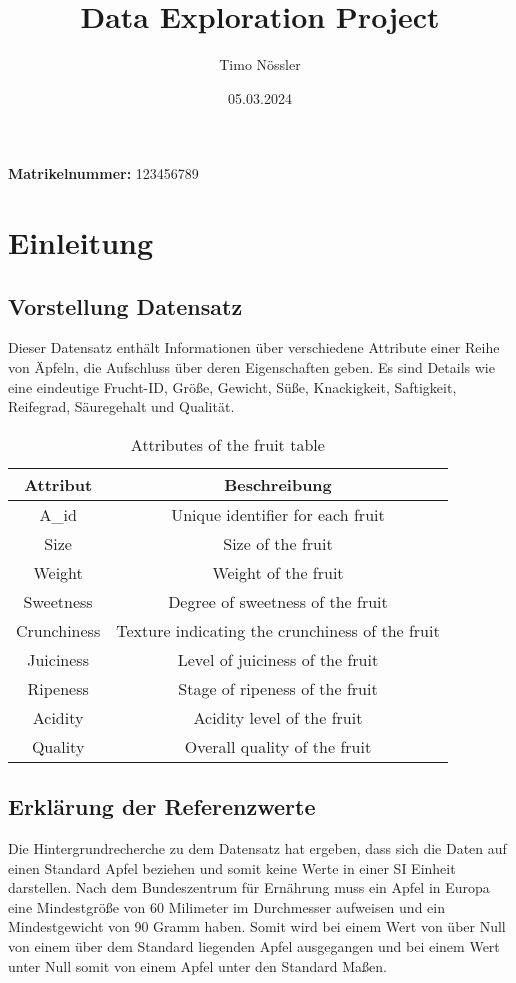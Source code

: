 \documentclass{article}
\title{\Huge Data Exploration Project}
\author{Timo Nössler}
\date{\vspace{2cm}05.03.2024}
\begin{document}
\clearpage\maketitle
\thispagestyle{empty}
\begin{center}
\textbf{Matrikelnummer:} 123456789
\end{center}
\newpage
\tableofcontents
\newpage


\section{Einleitung}
\subsection{Vorstellung Datensatz}
Dieser Datensatz enthält Informationen über verschiedene Attribute einer Reihe von Äpfeln, die Aufschluss über deren Eigenschaften geben. Es sind Details wie eine eindeutige Frucht-ID, Größe, Gewicht, Süße, Knackigkeit, Saftigkeit, Reifegrad, Säuregehalt und Qualität. 
\begin{table}[h]
\centering
\begin{tabular}{|c|c|}
\hline
\textbf{Attribut} & \textbf{Beschreibung} \\
\hline
A\_id & Unique identifier for each fruit \\
Size & Size of the fruit \\
Weight & Weight of the fruit \\
Sweetness & Degree of sweetness of the fruit \\
Crunchiness & Texture indicating the crunchiness of the fruit \\
Juiciness & Level of juiciness of the fruit \\
Ripeness & Stage of ripeness of the fruit \\
Acidity & Acidity level of the fruit \\
Quality & Overall quality of the fruit \\
\hline
\end{tabular}
\caption{Attributes of the fruit table}
\end{table}


\subsection{Erklärung der Referenzwerte}
Die Hintergrundrecherche zu dem Datensatz hat ergeben, dass sich die Daten auf einen Standard Apfel beziehen und somit keine Werte in einer SI Einheit darstellen. Nach dem Bundeszentrum für Ernährung muss ein Apfel in Europa eine Mindestgröße von 60 Milimeter im Durchmesser aufweisen und ein Mindestgewicht von 90 Gramm haben. Somit wird bei einem Wert von über Null von einem über dem Standard liegenden Apfel ausgegangen und bei einem Wert unter Null somit von einem Apfel unter den Standard Maßen.
\end{document}
